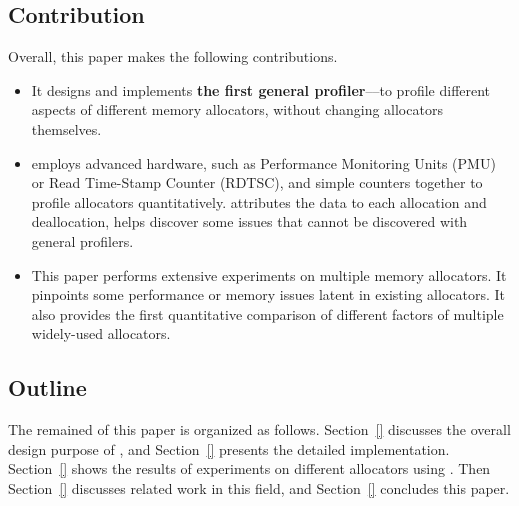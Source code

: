  

\subsection*{Contribution}

Overall, this paper makes the following contributions. 

\begin{itemize}
\item It designs and implements \textbf{the first general profiler}--\MP{}--to profile different aspects of different memory allocators, without changing allocators themselves.  

\item \MP{} employs advanced hardware, such as Performance Monitoring Units (PMU) or Read Time-Stamp Counter (RDTSC), and simple counters together to profile allocators quantitatively. \MP{} attributes the data to each allocation and deallocation, helps discover some issues that cannot be discovered with general profilers.  


\item This paper performs extensive experiments on multiple memory allocators. It pinpoints some performance or memory issues latent in existing allocators. It also provides the first quantitative comparison of different factors of multiple widely-used allocators.  

\end{itemize} 

\subsection*{Outline}

The remained of this paper is organized as follows. Section~\ref{} discusses the overall design purpose of \MP{}, and Section~\ref{} presents the detailed implementation. Section~\ref{} shows the results of experiments on different allocators using \MP{}. Then Section~\ref{} discusses related work in this field, and Section~\ref{} concludes this paper. 